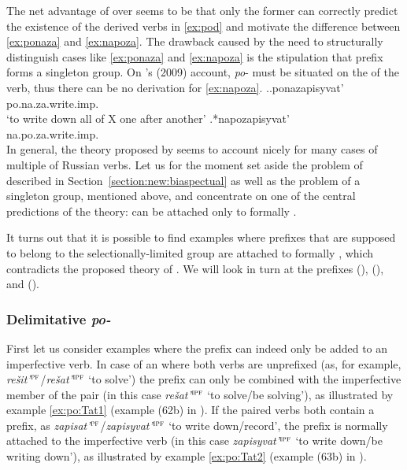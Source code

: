 The net advantage of \citet{Tatevosov:09} over \citet{Tatevosov:07} seems to be that only the former can correctly predict the existence of the derived verbs in \ref{ex:pod} and motivate the difference between \ref{ex:ponaza} and \ref{ex:napoza}. The drawback caused by the need to structurally distinguish cases like \ref{ex:ponaza} and \ref{ex:napoza} is the stipulation that  prefix  forms a singleton group. On \citeauthor{Tatevosov:09}'s (2009) account,  \textit{po}- must be situated on the  of the verb, thus there can be no derivation for \ref{ex:napoza}.
\ex.\ag.\label{ex:ponaza}ponazapisyvat'\\
po.na.za.write.imp.\\
\trans `to write down all of X one after another'
\bg.\label{ex:napoza}*napozapisyvat'\\
na.po.za.write.imp.\\

In general, the theory proposed by \citet{Tatevosov:09} seems to account nicely for many cases of multiple  of Russian verbs. Let us for the moment set aside the problem of  described in Section~\ref{section:new:biaspectual} as well as the problem of a singleton group, mentioned above, and concentrate on one of the central predictions of the theory:  can be attached only to formally .

It turns out that it is possible to find examples where prefixes that are supposed to belong to the selectionally-limited group are attached to formally , which contradicts the proposed theory of . We will look in turn at the prefixes  (),  (), and  (). 

\subsubsection{Delimitative \textit{po-}}
First let us consider examples where the  prefix  can indeed only be added to an imperfective verb. In case of an  where both verbs are unprefixed (as, for example, \textit{re\v{s}it'}$^{\textsc{pf}}$\slash\textit{re\v{s}at'}$^{\textsc{ipf}}$ `to solve') the prefix  can only be combined with the imperfective member of the pair (in this case \textit{re\v{s}at'}$^{\textsc{ipf}}$ `to solve/be solving'), as illustrated by example \ref{ex:po:Tat1} (example (62b) in \citealt[121]{Tatevosov:09}). If the paired verbs both contain a prefix, as \textit{zapisat'}$^{\textsc{pf}}$\slash\textit{zapisyvat'}$^{\textsc{ipf}}$ `to write down/record', the  prefix  is normally attached to the imperfective verb (in this case \textit{zapisyvat'}$^{\textsc{ipf}}$ `to write down/be writing down'), as illustrated by example \ref{ex:po:Tat2} (example (63b) in \citealt[121]{Tatevosov:09}).

